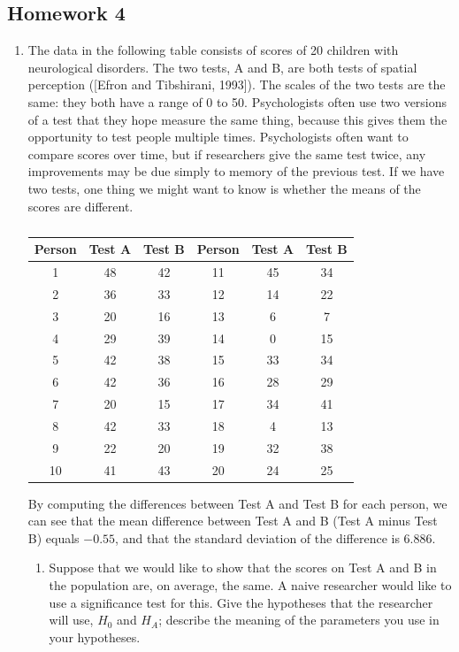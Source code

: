 \subsection{Homework 4}
\begin{enumerate}
    \item The data in the following table consists of scores of 20 children with neurological disorders. The two tests, A and B, are both tests of spatial perception ([Efron and Tibshirani, 1993]). The scales of the two tests are the same: they both have a range of 0 to 50. Psychologists often use two versions of a test that they hope measure the same thing, because this gives them the opportunity to test people multiple times. Psychologists often want to compare scores over time, but if researchers give the same test twice, any improvements may be due simply to memory of the previous test. If we have two tests, one thing we might want to know is whether the means of the scores are different.
    \FloatBarrier
    \begin{table}[h]
    \centering
    \begin{tabular}{@{}ccc||ccc@{}}
    Person & Test A & Test B & Person & Test A & Test B \\ \hline
    1 & 48 & 42 & 11 & 45 & 34 \\
    2 & 36 & 33 & 12 & 14 & 22 \\
    3 & 20 & 16 & 13 & 6 & 7 \\
    4 & 29 & 39 & 14 & 0 & 15 \\
    5 & 42 & 38 & 15 & 33 & 34 \\
    6 & 42 & 36 & 16 & 28 & 29 \\
    7 & 20 & 15 & 17 & 34 & 41 \\
    8 & 42 & 33 & 18 & 4 & 13 \\
    9 & 22 & 20 & 19 & 32 & 38 \\
    10 & 41 & 43 & 20 & 24 & 25
    \end{tabular}
    \caption{}
    \label{tab:hw4q1}
    \end{table}
    \FloatBarrier
    By computing the differences between Test A and Test B for each person, we can see that the mean difference between Test A and B (Test A minus Test B) equals $-0.55$, and that the standard deviation of the difference is 6.886.
    \begin{enumerate}
        \item Suppose that we would like to show that the scores on Test A and B in the population are, on average, the same. A naive researcher would like to use a significance test for this. Give the hypotheses that the researcher will use, $H_0$ and $H_A$; describe the meaning of the parameters you use in your hypotheses.

\end{enumerate}
\end{enumerate}
